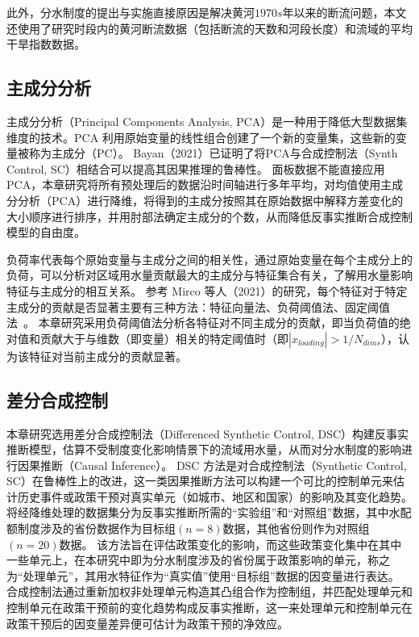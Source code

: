 此外，分水制度的提出与实施直接原因是解决黄河$1970s$年以来的断流问题\cite{wang2019b}，本文还使用了研究时段内的黄河断流数据（包括断流的天数和河段长度）和流域的平均干旱指数数据\cite{wang2022e}。

\subsection{主成分分析}

主成分分析（Principal Components Analysis, PCA）是一种用于降低大型数据集维度的技术。PCA 利用原始变量的线性组合创建了一个新的变量集，这些新的变量被称为主成分（PC）。
Bayan（2021）\cite{bayani2021}已证明了将PCA与合成控制法（Synth Control, SC）相结合可以提高其因果推理的鲁棒性。
面板数据不能直接应用 PCA，本章研究将所有预处理后的数据沿时间轴进行多年平均，对均值使用主成分分析（PCA）进行降维，将得到的主成分按照其在原始数据中解释方差变化的大小顺序进行排序，并用肘部法确定主成分的个数，从而降低反事实推断合成控制模型的自由度。

负荷率代表每个原始变量与主成分之间的相关性，通过原始变量在每个主成分上的负荷，可以分析对区域用水量贡献最大的主成分与特征集合有关，了解用水量影响特征与主成分的相互关系。
参考 Mirco 等人（2021）的研究，每个特征对于特定主成分的贡献是否显著主要有三种方法：特征向量法、负荷阈值法、固定阈值法~\cite{migliavacca2021}。
本章研究采用负荷阈值法分析各特征对不同主成分的贡献，即当负荷值的绝对值和贡献大于与维数（即变量）相关的特定阈值时（即$|{x_{loading}}| > 1/N_{dims}$），认为该特征对当前主成分的贡献显著。


\subsection{差分合成控制}\label{sec:DSC}

本章研究选用差分合成控制法（Differenced Synthetic Control, DSC）构建反事实推断模型，估算不受制度变化影响情景下的流域用水量，从而对分水制度的影响进行因果推断（Causal Inference）。
DSC 方法是对合成控制法（Synthetic Control, SC）在鲁棒性上的改进\cite{billmeier2013, smith2015}，这一类因果推断方法可以构建一个可比的控制单元来估计历史事件或政策干预对真实单元（如城市、地区和国家）的影响及其变化趋势\cite{abadie2010, abadie2015, hill2021}。
将经降维处理的数据集分为反事实推断所需的“实验组”和“对照组”数据，其中水配额制度涉及的省份数据作为目标组$(n=8)$数据，其他省份则作为对照组$(n=20)$数据。
该方法旨在评估政策变化的影响，而这些政策变化集中在其中一些单元上，在本研究中即为分水制度涉及的省份属于政策影响的单元，称之为“处理单元”，其用水特征作为“真实值”使用“目标组”数据的因变量进行表达。
合成控制法通过重新加权非处理单元构造其凸组合作为控制组，并匹配处理单元和控制单元在政策干预前的变化趋势构成反事实推断，这一来处理单元和控制单元在政策干预后的因变量差异便可估计为政策干预的净效应。

